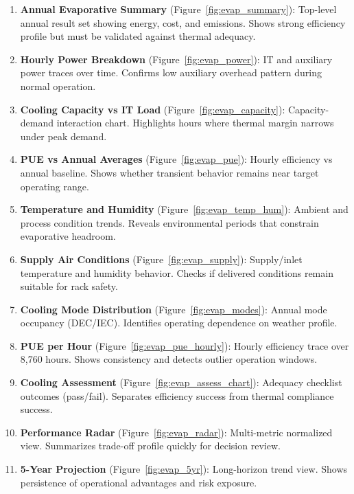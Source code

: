 \documentclass[12pt,a4paper]{report}
\begin{document}
\begin{enumerate}[noitemsep]
  \item \textbf{Annual Evaporative Summary} (Figure~\ref{fig:evap_summary}): Top-level annual result set showing energy, cost, and emissions. Shows strong efficiency profile but must be validated against thermal adequacy.
  
  \item \textbf{Hourly Power Breakdown} (Figure~\ref{fig:evap_power}): IT and auxiliary power traces over time. Confirms low auxiliary overhead pattern during normal operation.
  
  \item \textbf{Cooling Capacity vs IT Load} (Figure~\ref{fig:evap_capacity}): Capacity-demand interaction chart. Highlights hours where thermal margin narrows under peak demand.
  
  \item \textbf{PUE vs Annual Averages} (Figure~\ref{fig:evap_pue}): Hourly efficiency vs annual baseline. Shows whether transient behavior remains near target operating range.
  
  \item \textbf{Temperature and Humidity} (Figure~\ref{fig:evap_temp_hum}): Ambient and process condition trends. Reveals environmental periods that constrain evaporative headroom.
  
  \item \textbf{Supply Air Conditions} (Figure~\ref{fig:evap_supply}): Supply/inlet temperature and humidity behavior. Checks if delivered conditions remain suitable for rack safety.
  
  \item \textbf{Cooling Mode Distribution} (Figure~\ref{fig:evap_modes}): Annual mode occupancy (DEC/IEC). Identifies operating dependence on weather profile.
  
  \item \textbf{PUE per Hour} (Figure~\ref{fig:evap_pue_hourly}): Hourly efficiency trace over 8{,}760 hours. Shows consistency and detects outlier operation windows.
  
  \item \textbf{Cooling Assessment} (Figure~\ref{fig:evap_assess_chart}): Adequacy checklist outcomes (pass/fail). Separates efficiency success from thermal compliance success.
  
  \item \textbf{Performance Radar} (Figure~\ref{fig:evap_radar}): Multi-metric normalized view. Summarizes trade-off profile quickly for decision review.
  
  \item \textbf{5-Year Projection} (Figure~\ref{fig:evap_5yr}): Long-horizon trend view. Shows persistence of operational advantages and risk exposure.
\end{enumerate}
\end{document}
